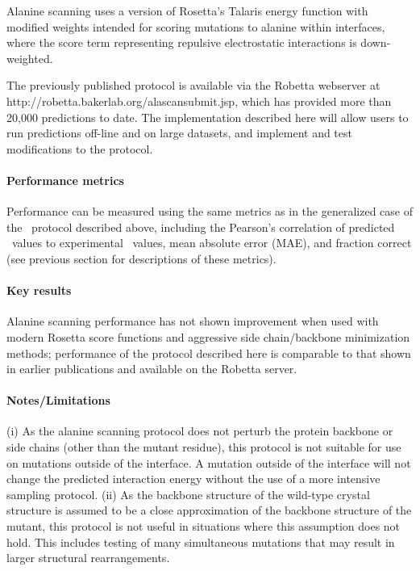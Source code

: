 Alanine scanning uses a version of Rosetta’s Talaris energy function with modified weights intended for scoring mutations to alanine within interfaces, where the score term representing repulsive electrostatic interactions is down-weighted.

The previously published protocol \cite{kortemme_simple_2002,kortemme_computational_2004} is available via the Robetta webserver at http://robetta.bakerlab.org/alascansubmit.jsp, which has provided more than 20,000 predictions to date. The implementation described here will allow users to run predictions off-line and on large datasets, and implement and test modifications to the protocol.

\paragraph{Performance metrics}

Performance can be measured using the same metrics as in the generalized case of the \ddg\ protocol described above, including the Pearson’s correlation of predicted \ddg\ values to experimental \ddg\ values, mean absolute error (MAE), and fraction correct (see previous section for descriptions of these metrics).

\paragraph{Key results}

Alanine scanning performance has not shown improvement when used with modern Rosetta score functions and aggressive side chain/backbone minimization methods; performance of the protocol described here is comparable to that shown in earlier publications \cite{kortemme_simple_2002,kortemme_computational_2004} and available on the Robetta server.

\paragraph{Notes/Limitations}

(i) As the alanine scanning protocol does not perturb the protein backbone or side chains (other than the mutant residue), this protocol is not suitable for use on mutations outside of the interface. A mutation outside of the interface will not change the predicted interaction energy without the use of a more intensive sampling protocol. (ii) As the backbone structure of the wild-type crystal structure is assumed to be a close approximation of the backbone structure of the mutant, this protocol is not useful in situations where this assumption does not hold. This includes testing of many simultaneous mutations that may result in larger structural rearrangements.

